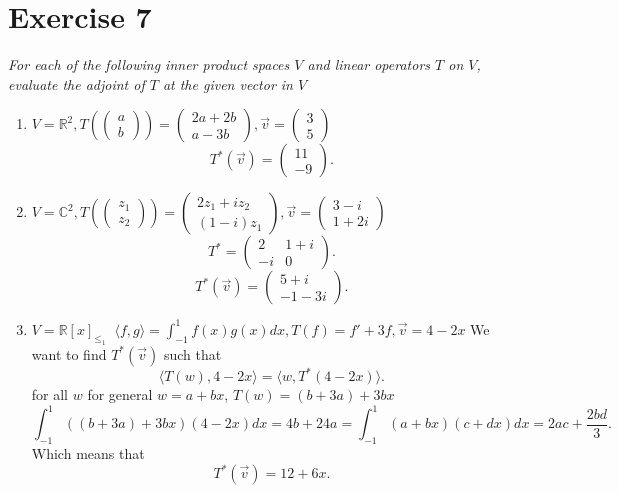 \documentclass{article}
\begin{document}
     \section{Exercise 7}
     \emph{
         For each of the following inner product spaces $V$ and linear operators $T$ on $V$, 
         evaluate the adjoint of $T$ at the given vector in $V$
     }
     \begin{enumerate}
         \item $V = \mathbb{R}^2, T(\begin{pmatrix} a \\ b \end{pmatrix} ) = \begin{pmatrix} 2a + 2b \\ a- 3b \end{pmatrix} , \vec{v} = \begin{pmatrix} 3 \\ 5 \end{pmatrix} $\\
             \[
             T^{*}(\vec{v}) = \begin{pmatrix} 11 \\ -9 \end{pmatrix} 
             .\] 
         \item $V = \mathbb{C}^2, T( \begin{pmatrix} z_1 \\ z_2 \end{pmatrix} ) = \begin{pmatrix} 2z_1 + iz_2 \\ (1-i)z_1 \end{pmatrix} , \vec{v} = \begin{pmatrix} 3-i \\ 1 + 2i \end{pmatrix} $ 
             \[
                 T^{*} = \begin{pmatrix} 2 & 1 + i \\ -i & 0 \end{pmatrix} 
             .\] 
             \[
             T^{*}(\vec{v})  = \begin{pmatrix} 5 + i \\ -1 -3i \end{pmatrix} 
             .\] 

         \item $V = \mathbb{R}[x]_{\le_1} \; \; \langle f, g \rangle = \int_{-1}^{1}f(x)g(x)dx, T(f) = f' + 3f, \vec{v} = 4-2x$ 
             We want to find $T^{*}(\vec{v})$ such that
             \[
             \langle T(w), 4-2x \rangle = \langle w, T^{*}(4-2x) \rangle
             .\] 
             for all $w$ 
             for general $w = a + bx$,  $T(w) = (b+3a) + 3bx$
              \[
             \int_{-1}^{1}((b+3a)+3bx)(4-2x)dx =  4b + 24a = \int_{-1}^{1}(a+bx)(c+dx)dx = 2ac + \frac{2bd}{3}
             .\] 
             Which means that
             \[
             T^{*}(\vec{v}) = 12+6x
             .\] 
     \end{enumerate}
\end{document}
